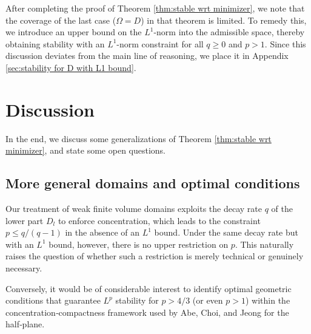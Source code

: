 \documentclass[11pt,letterpaper]{amsart}
\theoremstyle{definition}
\theoremstyle{remark}
\newcommand{\D}{\mathcal{D}}
\numberwithin{equation}{section}
\begin{document}
\rightline{$\Box$}

After completing the proof of Theorem \ref{thm:stable wrt minimizer}, we note that the coverage of the last case ($\Omega = D$) in that theorem is limited. To remedy this, we introduce an upper bound on the $L^1$-norm into the admissible space, thereby obtaining stability with an $L^1$-norm constraint for all $q\ge 0$ and $p>1$. Since this discussion deviates from the main line of reasoning, we place it in Appendix \ref{sec:stability for D with L1 bound}.


\section{Discussion}\label{sec:discussion}

In the end, we discuss some generalizations of Theorem \ref{thm:stable wrt minimizer}, and state some open questions. 

\subsection{More general domains and optimal conditions} 

Our treatment of weak finite volume domains exploits the decay rate $q$ of the lower part $D_l$ to enforce concentration, which leads to the constraint $p \le q/(q-1)$ in the absence of an $L^1$ bound. Under the same decay rate but with an $L^1$ bound, however, there is no upper restriction on $p$. This naturally raises the question of whether such a restriction is merely technical or genuinely necessary.  

Conversely, it would be of considerable interest to identify optimal geometric conditions that guarantee $L^p$ stability for $p>4/3$ (or even $p>1$) within the concentration‑compactness framework used by Abe, Choi, and Jeong \cite{Abe2025StabilityOL} for the half‑plane. 
\end{document}
